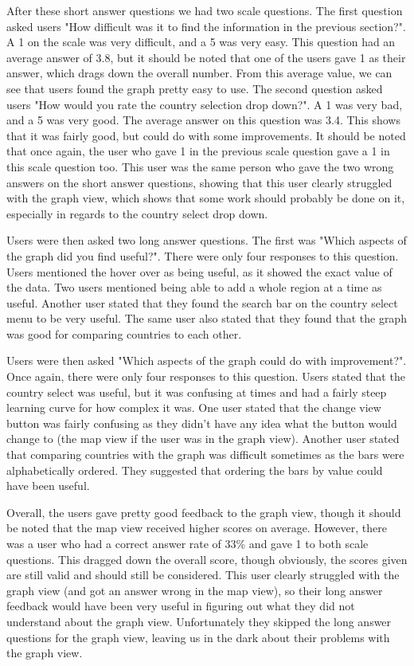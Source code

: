 \documentclass[10pt, journal]{IEEEtran}
\begin{document}
After these short answer questions we had two scale questions. The first question asked users "How difficult was it to find the information in the previous section?". A 1 on the scale was very difficult, and a 5 was very easy. This question had an average answer of 3.8, but it should be noted that one of the users gave 1 as their answer, which drags down the overall number. From this average value, we can see that users found the graph pretty easy to use. The second question asked users "How would you rate the country selection drop down?". A 1 was very bad, and a 5 was very good. The average answer on this question was 3.4. This shows that it was fairly good, but could do with some improvements. It should be noted that once again, the user who gave 1 in the previous scale question gave a 1 in this scale question too. This user was the same person who gave the two wrong answers on the short answer questions, showing that this user clearly struggled with the graph view, which shows that some work should probably be done on it, especially in regards to the country select drop down.

Users were then asked two long answer questions. The first was "Which aspects of the graph did you find useful?". There were only four responses to this question. Users mentioned the hover over as being useful, as it showed the exact value of the data. Two users mentioned being able to add a whole region at a time as useful. Another user stated that they found the search bar on the country select menu to be very useful. The same user also stated that they found that the graph was good for comparing countries to each other. 

Users were then asked "Which aspects of the graph could do with improvement?". Once again, there were only four responses to this question. Users stated that the country select was useful, but it was confusing at times and had a fairly steep learning curve for how complex it was. One user stated that the change view button was fairly confusing as they didn't have any idea what the button would change to (the map view if the user was in the graph view). Another user stated that comparing countries with the graph was difficult sometimes as the bars were alphabetically ordered. They suggested that ordering the bars by value could have been useful.

Overall, the users gave pretty good feedback to the graph view, though it should be noted that the map view received higher scores on average. However, there was a user who had a correct answer rate of 33\% and gave 1 to both scale questions. This dragged down the overall score, though obviously, the scores given are still valid and should still be considered. This user clearly struggled with the graph view (and got an answer wrong in the map view), so their long answer feedback would have been very useful in figuring out what they did not understand about the graph view. Unfortunately they skipped the long answer questions for the graph view, leaving us in the dark about their problems with the graph view.
\end{document}
